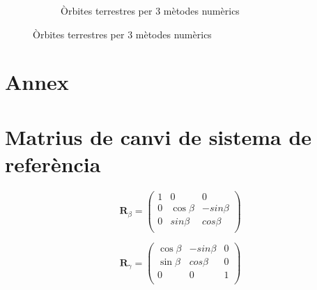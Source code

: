 \documentclass[11pt]{article}
\begin{document}
\begin{figure}[hbt!]
\begin{subfigure}{0.5\textwidth}
        \caption{Òrbites terrestres per 3 mètodes numèrics}
        \label{fig: orbita3met}
    \end{subfigure}
\end{figure}

\section*{Annex}
\appendix

\section{Matrius de canvi de sistema de referència}\label{annex: matr_rot}
\begin{equation}
    \mathbf{R}_{\beta}=
    \begin{pmatrix}
      1 & 0 & 0   \\
      0 & \cos\beta& -sin\beta \\
      0 & sin\beta & cos\beta \\
    \end{pmatrix}
\end{equation}  

\begin{equation}
    \mathbf{R}_{\gamma}=
    \begin{pmatrix}
       \cos\beta& -sin\beta& 0 \\
       \sin\beta & cos\beta &0\\
      0 & 0 & 1  \\
    \end{pmatrix}
\end{equation}  
\end{document}
